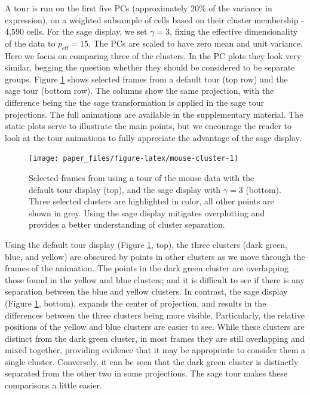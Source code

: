 \documentclass[]{interact}
\theoremstyle{plain}%
\theoremstyle{definition}
\theoremstyle{remark}
\begin{document}
A tour is run on the first five PCs (approximately 20\% of the variance
in expression), on a weighted subsample of cells based on their cluster
membership - 4,590 cells. For the sage display, we set \(\gamma = 3\),
fixing the effective dimensionality of the data to
\(p_{\mathrm{eff}} = 15\). The PCs are scaled to have zero mean and unit
variance. Here we focus on comparing three of the clusters. In the PC
plots they look very similar, begging the question whether they should
be considered to be separate groups. Figure \ref{fig:mouse-cluster}
shows selected frames from a default tour (top row) and the sage tour
(bottom row). The columns show the same projection, with the difference
being the the sage transformation is applied in the sage tour
projections. The full animations are available in the supplementary
material. The static plots serve to illustrate the main points, but we
encourage the reader to look at the tour animations to fully appreciate
the advantage of the sage display.

\begin{figure}

{\centering \texttt{[image: paper\_files/figure-latex/mouse-cluster-1]} 

}

\caption{Selected frames from using a tour of the mouse data with the default tour display (top), and the sage display with $\gamma=3$ (bottom). Three selected clusters are highlighted in color, all other points are shown in grey. Using the sage display mitigates overplotting and provides a better understanding of cluster separation.}\label{fig:mouse-cluster}
\end{figure}

Using the default tour display (Figure \ref{fig:mouse-cluster}, top),
the three clusters (dark green, blue, and yellow) are obscured by points
in other clusters as we move through the frames of the animation. The
points in the dark green cluster are overlapping those found in the
yellow and blue clusters; and it is difficult to see if there is any
separation between the blue and yellow clusters. In contrast, the sage
display (Figure \ref{fig:mouse-cluster}, bottom), expands the center of
projection, and results in the differences between the three clusters
being more visible. Particularly, the relative positions of the yellow
and blue clusters are easier to see. While these clusters are distinct
from the dark green cluster, in most frames they are still overlapping
and mixed together, providing evidence that it may be appropriate to
consider them a single cluster. Conversely, it can be seen that the dark
green cluster is distinctly separated from the other two in some
projections. The sage tour makes these comparisons a little easier.
\end{document}
